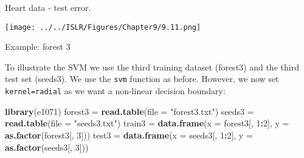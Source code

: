 \documentclass[10pt,ignorenonframetext,]{beamer}
\newenvironment{Shaded}{\begin{snugshade}}{\end{snugshade}}
\newcommand{\KeywordTok}[1]{\textcolor[rgb]{0.13,0.29,0.53}{\textbf{#1}}}
\newcommand{\DataTypeTok}[1]{\textcolor[rgb]{0.13,0.29,0.53}{#1}}
\newcommand{\DecValTok}[1]{\textcolor[rgb]{0.00,0.00,0.81}{#1}}
\newcommand{\StringTok}[1]{\textcolor[rgb]{0.31,0.60,0.02}{#1}}
\newcommand{\OperatorTok}[1]{\textcolor[rgb]{0.81,0.36,0.00}{\textbf{#1}}}
\newcommand{\NormalTok}[1]{#1}
\begin{document}
\begin{frame}

Heart data - test error.

\texttt{[image: ../../ISLR/Figures/Chapter9/9.11.png]}

\end{frame}

\begin{frame}[fragile]

\begin{block}{Example: forest 3}

To illustrate the SVM we use the third training dataset (forest3) and
the third test set (seeds3). We use the \texttt{svm} function as before.
However, we now set
\texttt{kernel=\textquotesingle{}radial\textquotesingle{}} as we want a
non-linear decision boundary:

\end{block}

\end{frame}

\begin{frame}[fragile]

\footnotesize

\begin{Shaded}
\begin{Highlighting}[]
\KeywordTok{library}\NormalTok{(e1071)}
\NormalTok{forest3 =}\StringTok{ }\KeywordTok{read.table}\NormalTok{(}\DataTypeTok{file =} \StringTok{"forest3.txt"}\NormalTok{)}
\NormalTok{seeds3 =}\StringTok{ }\KeywordTok{read.table}\NormalTok{(}\DataTypeTok{file =} \StringTok{"seeds3.txt"}\NormalTok{)}
\NormalTok{train3 =}\StringTok{ }\KeywordTok{data.frame}\NormalTok{(}\DataTypeTok{x =}\NormalTok{ forest3[, }\DecValTok{1}\OperatorTok{:}\DecValTok{2}\NormalTok{], }\DataTypeTok{y =} \KeywordTok{as.factor}\NormalTok{(forest3[, }\DecValTok{3}\NormalTok{]))}
\NormalTok{test3 =}\StringTok{ }\KeywordTok{data.frame}\NormalTok{(}\DataTypeTok{x =}\NormalTok{ seeds3[, }\DecValTok{1}\OperatorTok{:}\DecValTok{2}\NormalTok{], }\DataTypeTok{y =} \KeywordTok{as.factor}\NormalTok{(seeds3[, }\DecValTok{3}\NormalTok{]))}
\end{Highlighting}
\end{Shaded}

\end{frame}
\end{document}
